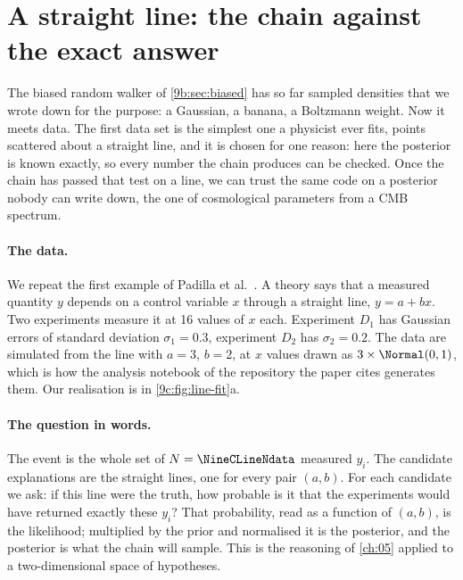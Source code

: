 \providecommand{\NineCIsTensCW}{}\renewcommand{\NineCIsTensCW}{0.1153}
\providecommand{\NineCIsTensCR}{}\renewcommand{\NineCIsTensCR}{0.1152}
\providecommand{\NineCIsTensNW}{}\renewcommand{\NineCIsTensNW}{0.9771}
\providecommand{\NineCIsTensNR}{}\renewcommand{\NineCIsTensNR}{0.9773}
\providecommand{\NineCIsTensHext}{}\renewcommand{\NineCIsTensHext}{73.04}
\providecommand{\NineCIsTenssHext}{}\renewcommand{\NineCIsTenssHext}{1.04}
\providecommand{\NineCIsTensTension}{}\renewcommand{\NineCIsTensTension}{4.3}
\providecommand{\NineCIsNpost}{}\renewcommand{\NineCIsNpost}{144000}
\providecommand{\NineCIsHzero}{}\renewcommand{\NineCIsHzero}{67.06}
\providecommand{\NineCIsSHzero}{}\renewcommand{\NineCIsSHzero}{0.93}
\providecommand{\NineCIsMinutes}{}\renewcommand{\NineCIsMinutes}{24.8}
\section{A straight line: the chain against the exact answer}
\label{9c:sec:line}

The biased random walker of \cref{9b:sec:biased} has so far sampled densities that we wrote down
for the purpose: a Gaussian, a banana, a Boltzmann weight. Now it meets data. The first data set
is the simplest one a physicist ever fits, points scattered about a straight line, and it is
chosen for one reason: here the posterior is known exactly, so every number the chain produces
can be checked. Once the chain has passed that test on a line, we can trust the same code on a
posterior nobody can write down, the one of cosmological parameters from a CMB spectrum.

\paragraph{The data.} We repeat the first example of Padilla et al.\
\cite{Padilla2019}. A theory says that a measured quantity $y$ depends on a
control variable $x$ through a straight line, $y=a+bx$. Two experiments measure it at 16 values of
$x$ each. Experiment $D_1$ has Gaussian errors of standard deviation $\sigma_1=0.3$, experiment $D_2$
has $\sigma_2=0.2$. The data are simulated from the line with $a=3$, $b=2$, at $x$ values drawn as
$3\times\Normal(0,1)$, which is how the analysis notebook of the repository the paper cites
generates them. Our realisation is in \cref{9c:fig:line-fit}a.

\paragraph{The question in words.} The event is the whole set of $N=\NineCLineNdata$ measured
$y_i$. The candidate explanations are the straight lines, one for every pair $(a,b)$. For each
candidate we ask: if this line were the truth, how probable is it that the experiments would have
returned exactly these $y_i$? That probability, read as a function of $(a,b)$, is the likelihood;
multiplied by the prior and normalised it is the posterior, and the posterior is what the chain
will sample. This is the reasoning of \cref{ch:05} applied to a two-dimensional space of
hypotheses.


